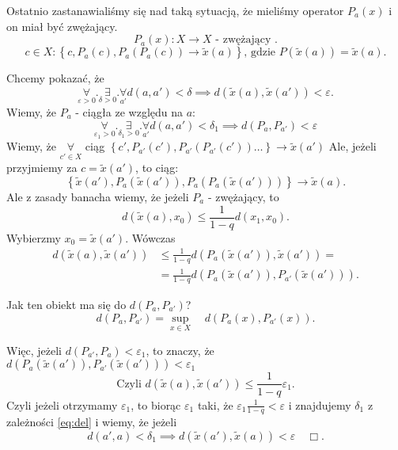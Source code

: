 \documentclass[../main.tex]{subfiles}
\begin{document}
Ostatnio zastanawialiśmy się nad taką sytuacją, że mieliśmy operator $P_a(x)$ i on miał być zwężający. \[
    P_a(x): X\to X \text{ - zwężający }
.\]
\[
    c\in X: \left\{ c,P_a(c),P_a(P_a(c)) \to \tilde x(a) \right\}\text{, gdzie }P(\tilde x(a)) = \tilde x(a)
.\]
\begin{dowod}
    Chcemy pokazać, że \[
        \underset{\varepsilon >0}{\forall} . \underset{\delta > 0}{\exists}. \underset{a'}{\forall}  d(a,a') < \delta \implies d(\tilde x(a),\tilde x(a')) < \varepsilon
    .\]
    Wiemy, że $P_a$ - ciągła ze względu na $a$:
    \begin{equation}\label{eq:del}
        \underset{\varepsilon_1>0}{\forall}. \underset{\delta_1>0}{\exists} .\underset{a'}{\forall} d(a,a') < \delta_1 \implies d(P_a, P_{a'}) < \varepsilon
    \end{equation}
    Wiemy, że $\underset{c'\in X}{\forall}$ ciąg $\left\{ c',P_{a'}(c'), P_{a'}(P_{a'}(c'))\ldots \right\} \to \tilde x(a')$
    Ale, jeżeli przyjmiemy za $c = \tilde x(a')$, to ciąg:
    \[
        \left\{ \tilde x(a'),P_{a}(\tilde x(a')), P_{a}(P_{a}(\tilde x(a'))) \right\} \to \tilde x(a)
    .\]
    Ale z zasady banacha wiemy, że jeżeli $P_{a}$ - zwężający, to
    \[
        d(\tilde x(a),x_0) \le \frac{1}{1-q} d(x_1,x_0)
    .\]
    Wybierzmy $x_0 = \tilde x(a')$. Wówczas
    \begin{align*}
        d(\tilde x(a),\tilde x(a')) &\le \frac{1}{1-q}d(P_a(\tilde x(a')) ,\tilde x(a')) =\\
        &= \frac{1}{1-q} d(P_a(\tilde x(a')), P_{a'}(\tilde x(a')))
    .\end{align*}
    \begin{pytanie}
        Jak ten obiekt ma się do $d(P_{a},P_{a'})$?\\
        \[
            d(P_a,P_{a'}) = \underset{x\in X}{\sup} \quad d(P_a(x), P_{a'}(x))
        .\]
    \end{pytanie}
        Więc, jeżeli $d(P_{a'},P_a)<\varepsilon_1$, to znaczy, że $d(P_a(\tilde x(a')),P_{a'}(\tilde x(a'))) < \varepsilon_1$\\
        \[
            \text{Czyli } d(\tilde x(a),\tilde x(a')) \le \frac{1}{1-q} \varepsilon_1
        .\]
        Czyli jeżeli otrzymamy $\varepsilon_1$, to biorąc $\varepsilon_1$ taki, że $\varepsilon_1 \frac{1}{1-q}<\varepsilon$ i znajdujemy $\delta_1$ z zależności \ref{eq:del} i wiemy, że jeżeli
       \[
           d(a',a) < \delta_1 \implies d(\tilde x(a'),\tilde x(a))<\varepsilon \quad\Box
       .\]
\end{dowod}
\end{document}
